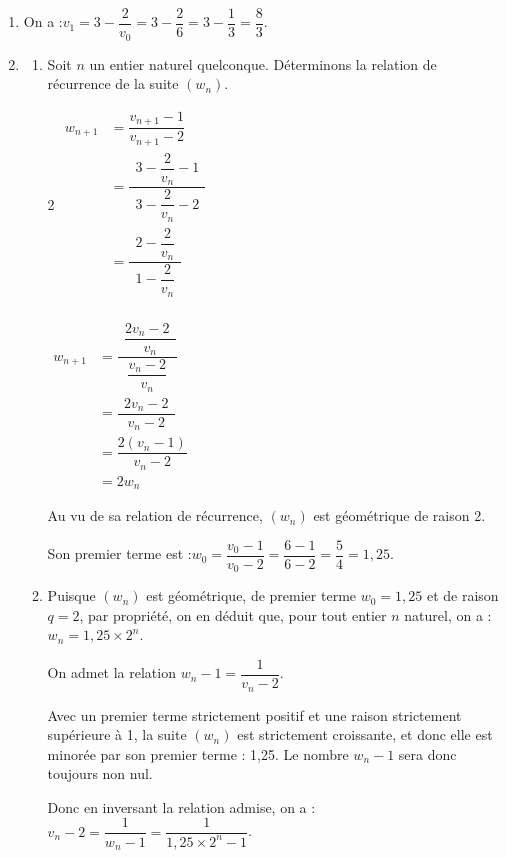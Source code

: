 	\begin{enumerate}
		\item On a :\quad $v_1 = 3 - \dfrac{2}{v_0} = 3 - \dfrac{2}{6} = 3 - \dfrac{1}{3} = \dfrac{8}{3}$.

		\item
		\begin{enumerate}
			\item Soit $n$ un entier naturel quelconque. Déterminons la relation de récurrence de la suite $(w_n)$.

			\begin{multicols}{2}
				$\begin{aligned}
				w_{n+1} &= \dfrac{v_{n+1} - 1}{v_{n+1} - 2} \\
				&= \dfrac{~~3 - \dfrac{2}{v_n} - 1~~}{3 - \dfrac{2}{v_n} - 2}\\
				&= \dfrac{~~2 - \dfrac{2}{v_n}~~}{1 - \dfrac{2}{v_n}}\\
			\end{aligned}$

			$\begin{aligned}
				w_{n+1} &= \dfrac{~~\dfrac{2v_n - 2~~}{v_n}}{\dfrac{v_n - 2}{v_n}} \\
				&= \dfrac{~~2v_n - 2~~}{v_n - 2} \\
				&= \dfrac{2(v_n - 1)}{v_n - 2} \\
				&= 2w_n
			\end{aligned}$
			\end{multicols}

			Au vu de sa relation de récurrence, $(w_n)$ est géométrique de raison 2.

			Son premier terme est :\quad $w_0 = \dfrac{v_0 - 1}{v_0 - 2} = \dfrac{6 - 1}{6 - 2} = \dfrac{5}{4} = 1,25$.

			\item Puisque $(w_n)$ est géométrique, de premier terme $w_0 = 1,25 $ et de raison $q = 2$, par propriété, on en déduit que, pour tout entier $n$ naturel, on a : \quad $w_n = 1,25 \times 2^n$.

			On admet la relation \quad $w_n - 1 = \dfrac{1}{v_n - 2}$.

			Avec un premier terme strictement positif et une raison strictement supérieure à 1, la suite $(w_n)$ est strictement croissante, et donc elle est minorée par son premier terme : 1,25. Le nombre $w_n - 1$ sera donc toujours non nul.

			Donc en inversant la relation admise, on a :\quad $v_n - 2 = \dfrac{1}{w_n - 1} = \dfrac{1}{1,25 \times 2^n - 1}$.


\end{enumerate}
\end{enumerate}
